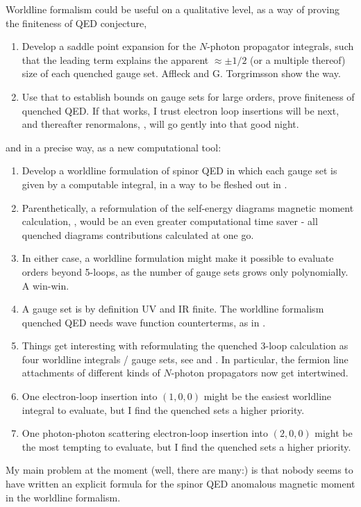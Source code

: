 Worldline formalism could be useful on a qualitative level, as a way of
proving the finiteness of QED conjecture,
    \begin{enumerate}
  \item
Develop a saddle point expansion for the $N$-photon propagator
integrals, such that the
leading term explains the apparent $\approx \pm 1/2$ (or a multiple
thereof) size of each quenched gauge set. Affleck \etal{}
and G. Torgrimsson \etal{} show the way.
  \item
Use that to establish bounds on gauge sets for large orders, prove
finiteness of quenched QED. If that works, I trust electron loop
insertions will be next, and thereafter renormalons, \etc,
will go 
{gently into that good night}.
    \end{enumerate}
and in a precise way, as a new computational tool:
    \begin{enumerate}
  \item
Develop a worldline formulation of spinor QED in which each gauge set is
given by a computable integral, in a way to be fleshed out in
.
  \item
Parenthetically, a reformulation of the self-energy diagrams magnetic
moment calculation, , would be an even greater
computational time saver - all quenched diagrams contributions calculated
at one go.
  \item
In either case, a
worldline formulation might make it possible to evaluate orders beyond
5-loops, as the number of gauge sets grows only polynomially. A win-win.
  \item
A gauge set is by definition UV and IR finite. The worldline formalism
quenched QED needs wave function
counterterms, as in .
  \item
Things get interesting with reformulating the quenched 3-loop calculation
as four worldline integrals / gauge sets, see  and
. In particular, the fermion line attachments of
different kinds of $N$-photon propagators now get intertwined.
  \item
One electron-loop insertion into $(1,0,0)$  might be the easiest
worldline integral to
evaluate, but I find the quenched sets a higher priority.
  \item
One photon-photon scattering electron-loop insertion into $(2,0,0)$ might
be the most tempting to evaluate, but I find the quenched sets a higher
priority.
    \end{enumerate}
My main problem at the moment (well, there are many:) is that nobody
seems to have written an explicit formula for the spinor QED anomalous
magnetic moment in the worldline formalism.

\newpage

\newpage

\newpage

\newpage
\printbibliography[heading=subbibintoc,title={References}]
